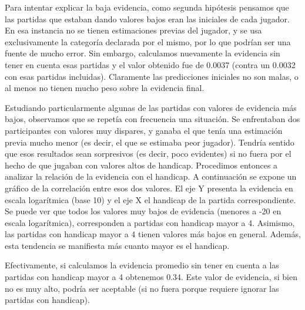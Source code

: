 \documentclass[a4paper,10pt]{report}
\begin{document}
Para intentar explicar la baja evidencia, como segunda hipótesis pensamos que las partidas que estaban dando valores bajos eran las iniciales de cada jugador.
En esa instancia no se tienen estimaciones previas del jugador, y se usa exclusivamente la categoría declarada por el mismo, por lo que podrían ser una fuente de mucho error.
Sin embargo, calculamos nuevamente la evidencia sin tener en cuenta esas partidas y el valor obtenido fue de 0.0037 (contra un 0.0032 con esas partidas incluidas).
Claramente las predicciones iniciales no son malas, o al menos no tienen mucho peso sobre la evidencia final.

Estudiando particularmente algunas de las partidas con valores de evidencia más bajos, observamos que se repetía con frecuencia una situación.
Se enfrentaban dos participantes con valores muy dispares, y ganaba el que tenía una estimación previa mucho menor (es decir, el que se estimaba peor jugador).
Tendría sentido que esos resultados sean sorpresivos (es decir, poco evidentes) si no fuera por el hecho de que jugaban con valores altos de handicap.
Procedimos entonces a analizar la relación de la evidencia con el handicap.
A continuación se expone un gráfico de la correlación entre esos dos valores.
El eje Y presenta la evidencia en escala logarítmica (base 10) y el eje X el handicap de la partida correspondiente.
Se puede ver que todos los valores muy bajos de evidencia (menores a -20 en escala logarítmica), corresponden a partidas con handicap mayor a 4.
Asimismo, las partidas con handicap mayor a 4 tienen valores más bajos en general.
Además, esta tendencia se manifiesta más cuanto mayor es el handicap.

Efectivamente, si calculamos la evidencia promedio sin tener en cuenta a las partidas con handicap mayor a 4 obtenemos 0.34.
Este valor de evidencia, si bien no es muy alto, podría ser aceptable (si no fuera porque requiere ignorar las partidas con handicap).
\end{document}
